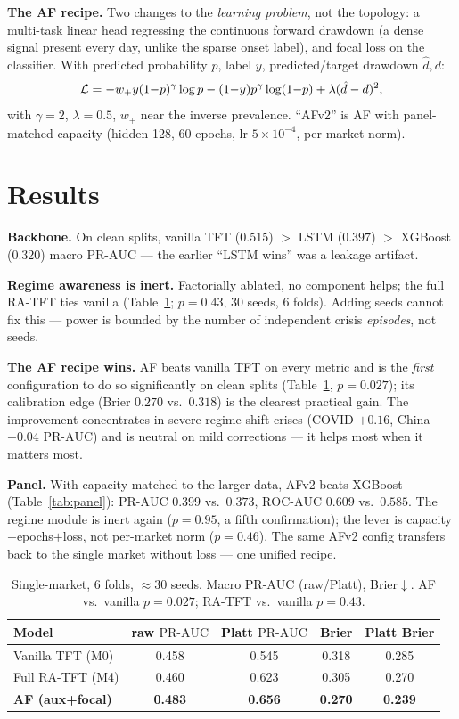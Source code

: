 \documentclass[10pt,a4paper,twocolumn]{article}
\newcommand{\prauc}{\mbox{PR-AUC}}
\newcommand{\rocauc}{\mbox{ROC-AUC}}
\begin{document}
\textbf{The AF recipe.} Two changes to the \emph{learning problem}, not the
topology: a multi-task linear head regressing the continuous forward drawdown
(a dense signal present every day, unlike the sparse onset label), and focal
loss \citep{lin2017focal} on the classifier. With predicted probability $p$,
label $y$, predicted/target drawdown $\hat d,d$:
\begin{equation}\small
\mathcal{L}= -w_{+}y(1{-}p)^{\gamma}\log p-(1{-}y)p^{\gamma}\log(1{-}p)
+\lambda(\hat d-d)^2,
\end{equation}
with $\gamma{=}2$, $\lambda{=}0.5$, $w_{+}$ near the inverse prevalence.
``AFv2'' is AF with panel-matched capacity (hidden 128, 60 epochs, lr
$5\!\times\!10^{-4}$, per-market norm).

\section{Results}
\textbf{Backbone.} On clean splits, vanilla TFT ($0.515$) $>$ LSTM ($0.397$)
$>$ XGBoost ($0.320$) macro $\prauc$ --- the earlier ``LSTM wins'' was a
leakage artifact.

\textbf{Regime awareness is inert.} Factorially ablated, no component helps;
the full RA-TFT ties vanilla (Table~\ref{tab:sm}; $p{=}0.43$, 30 seeds, 6
folds). Adding seeds cannot fix this --- power is bounded by the number of
independent crisis \emph{episodes}, not seeds.

\textbf{The AF recipe wins.} AF beats vanilla TFT on every metric and is the
\emph{first} configuration to do so significantly on clean splits
(Table~\ref{tab:sm}, $p{=}0.027$); its calibration edge (Brier $0.270$ vs.\
$0.318$) is the clearest practical gain. The improvement concentrates in
severe regime-shift crises (COVID $+0.16$, China $+0.04$ $\prauc$) and is
neutral on mild corrections --- it helps most when it matters most.

\textbf{Panel.} With capacity matched to the larger data, AFv2 beats XGBoost
(Table~\ref{tab:panel}): $\prauc$ $0.399$ vs.\ $0.373$, $\rocauc$ $0.609$ vs.\
$0.585$. The regime module is inert again ($p{=}0.95$, a fifth confirmation);
the lever is capacity$+$epochs$+$loss, not per-market norm ($p{=}0.46$). The
same AFv2 config transfers back to the single market without loss --- one
unified recipe.

\begin{table}[t]
\centering\footnotesize
\caption{Single-market, 6 folds, $\approx$30 seeds. Macro $\prauc$ (raw/Platt),
Brier$\downarrow$. AF vs.\ vanilla $p{=}0.027$; RA-TFT vs.\ vanilla $p{=}0.43$.}
\label{tab:sm}
\begin{tabular}{lcccc}
\toprule
Model & raw $\prauc$ & Platt $\prauc$ & Brier & Platt Brier \\
\midrule
Vanilla TFT (M0)  & 0.458 & 0.545 & 0.318 & 0.285 \\
Full RA-TFT (M4)  & 0.460 & 0.623 & 0.305 & 0.270 \\
\textbf{AF (aux+focal)} & \textbf{0.483} & \textbf{0.656} & \textbf{0.270} & \textbf{0.239} \\
\bottomrule
\end{tabular}
\end{table}
\end{document}

